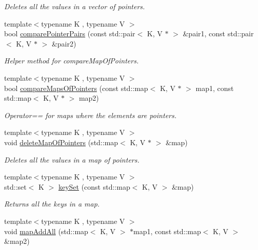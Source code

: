 \begin{DoxyCompactItemize}
\begin{DoxyCompactList}\small\item\em Deletes all the values in a vector of pointers. \item\end{DoxyCompactList}\item 
{\footnotesize template$<$typename K , typename V $>$ }\\bool \hyperlink{namespaceBUSBOY_a6596aa28107eeff9118f3104c26c7885}{comparePointerPairs} (const std::pair$<$ K, V $\ast$ $>$ \&pair1, const std::pair$<$ K, V $\ast$ $>$ \&pair2)
\begin{DoxyCompactList}\small\item\em Helper method for compareMapOfPointers. \item\end{DoxyCompactList}\item 
{\footnotesize template$<$typename K , typename V $>$ }\\bool \hyperlink{namespaceBUSBOY_a2f0bdbc11fc2b82453ee5929bdf887bc}{compareMapsOfPointers} (const std::map$<$ K, V $\ast$ $>$ map1, const std::map$<$ K, V $\ast$ $>$ map2)
\begin{DoxyCompactList}\small\item\em Operator== for maps where the elements are pointers. \item\end{DoxyCompactList}\item 
{\footnotesize template$<$typename K , typename V $>$ }\\void \hyperlink{namespaceBUSBOY_a1a243fc2a20b020d9280a4df0e325402}{deleteMapOfPointers} (std::map$<$ K, V $\ast$ $>$ \&map)
\begin{DoxyCompactList}\small\item\em Deletes all the values in a map of pointers. \item\end{DoxyCompactList}\item 
{\footnotesize template$<$typename K , typename V $>$ }\\std::set$<$ K $>$ \hyperlink{namespaceBUSBOY_a532e2d36284b7d18c06080572130098e}{keySet} (const std::map$<$ K, V $>$ \&map)
\begin{DoxyCompactList}\small\item\em Returns all the keys in a map. \item\end{DoxyCompactList}\item 
{\footnotesize template$<$typename K , typename V $>$ }\\void \hyperlink{namespaceBUSBOY_ab648989876ee1856c8eb27d39f7c5497}{mapAddAll} (std::map$<$ K, V $>$ $\ast$map1, const std::map$<$ K, V $>$ \&map2)

\end{DoxyCompactItemize}

